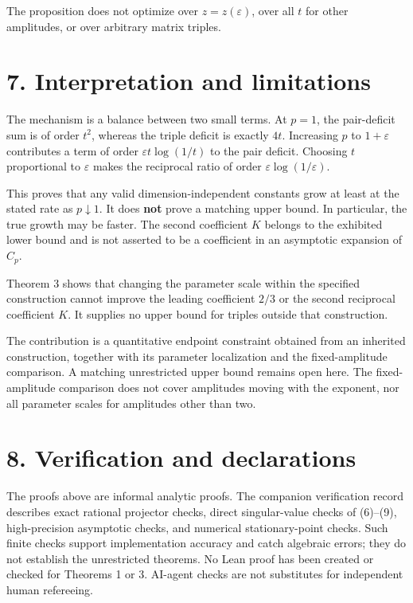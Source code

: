 \documentclass[11pt,a4paper]{article}
\begin{document}
The proposition does not optimize over \(z=z(\varepsilon)\), over all \(t\) for other amplitudes, or over arbitrary matrix triples.

\section*{7. Interpretation and limitations}\label{interpretation-and-limitations}

The mechanism is a balance between two small terms. At \(p=1\), the pair-deficit sum is of order \(t^2\), whereas the triple deficit is exactly \(4t\). Increasing \(p\) to \(1+\varepsilon\) contributes a term of order \(\varepsilon t\log(1/t)\) to the pair deficit. Choosing \(t\) proportional to \(\varepsilon\) makes the reciprocal ratio of order \(\varepsilon\log(1/\varepsilon)\).

This proves that any valid dimension-independent constants grow at least at the stated rate as \(p\downarrow1\). It does \textbf{not} prove a matching upper bound. In particular, the true growth may be faster. The second coefficient \(K\) belongs to the exhibited lower bound and is not asserted to be a coefficient in an asymptotic expansion of \(C_p\).

Theorem 3 shows that changing the parameter scale within the specified construction cannot improve the leading coefficient \(2/3\) or the second reciprocal coefficient \(K\). It supplies no upper bound for triples outside that construction.

The contribution is a quantitative endpoint constraint obtained from an inherited construction, together with its parameter localization and the fixed-amplitude comparison. A matching unrestricted upper bound remains open here. The fixed-amplitude comparison does not cover amplitudes moving with the exponent, nor all parameter scales for amplitudes other than two.

\section*{8. Verification and declarations}\label{verification-and-declarations}

The proofs above are informal analytic proofs. The companion verification record describes exact rational projector checks, direct singular-value checks of (6)--(9), high-precision asymptotic checks, and numerical stationary-point checks. Such finite checks support implementation accuracy and catch algebraic errors; they do not establish the unrestricted theorems. No Lean proof has been created or checked for Theorems 1 or 3. AI-agent checks are not substitutes for independent human refereeing.
\end{document}
